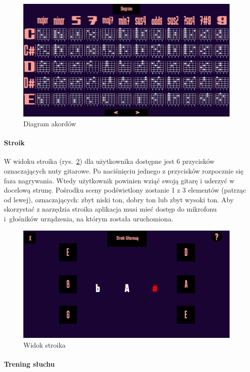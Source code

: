 
\begin{figure}[htb]
	\centering
	\includegraphics[width=.5\linewidth]{rysB/Diagram}
	\caption{Diagram akordów} \label{fig:DiagramAk}
\end{figure}

\paragraph{Stroik}

W widoku stroika (rys.~\ref{fig:Stroik}) dla użytkownika dostępne jest 6 przycisków oznaczających nuty gitarowe. Po naciśnięciu jednego z przycisków rozpocznie się faza nagrywania. Wtedy użytkownik powinien wziąć swoją gitarę i uderzyć w docelową strunę. Pośrodku sceny podświetlony zostanie 1 z 3 elementów (patrząc od lewej), oznaczających: zbyt niski ton, dobry ton lub zbyt wysoki ton. Aby skorzystać z narzędzia stroika aplikacja musi mieć dostęp do mikrofonu i~głośników urządzenia, na którym została uruchomiona.

\begin{figure}[htb]
	\centering
	\includegraphics[width=.5\linewidth]{rysB/Stroik}
	\caption{Widok stroika} \label{fig:Stroik}
\end{figure}


\paragraph{Trening słuchu}

